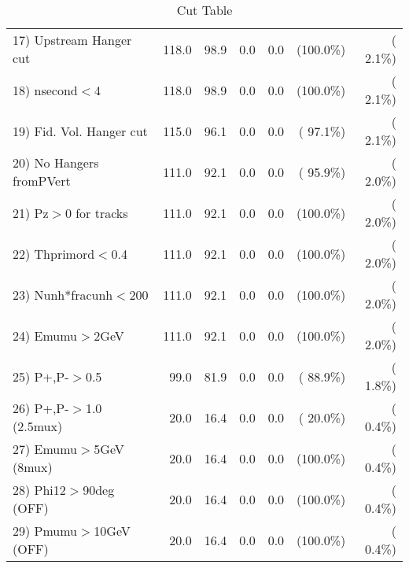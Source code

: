 \begin{table}[h!]
\begin{tabular}{||l||r|r|r|r|r|r||}
 17) Upstream Hanger cut  &        118.0 &         98.9 &          0.0 &          0.0 & (100.0\%) & (  2.1\%) \\
 18) nsecond$<$4          &        118.0 &         98.9 &          0.0 &          0.0 & (100.0\%) & (  2.1\%) \\
 19) Fid. Vol. Hanger cut &        115.0 &         96.1 &          0.0 &          0.0 & ( 97.1\%) & (  2.1\%) \\
 20) No Hangers fromPVert &        111.0 &         92.1 &          0.0 &          0.0 & ( 95.9\%) & (  2.0\%) \\
 21) Pz$>$0 for tracks    &        111.0 &         92.1 &          0.0 &          0.0 & (100.0\%) & (  2.0\%) \\
 22) Thprimord$<$0.4      &        111.0 &         92.1 &          0.0 &          0.0 & (100.0\%) & (  2.0\%) \\
 23) Nunh*fracunh$<$200   &        111.0 &         92.1 &          0.0 &          0.0 & (100.0\%) & (  2.0\%) \\
 24) Emumu$>$2GeV         &        111.0 &         92.1 &          0.0 &          0.0 & (100.0\%) & (  2.0\%) \\
 25) P+,P-$>$0.5          &         99.0 &         81.9 &          0.0 &          0.0 & ( 88.9\%) & (  1.8\%) \\
 26) P+,P-$>$1.0 (2.5mux) &         20.0 &         16.4 &          0.0 &          0.0 & ( 20.0\%) & (  0.4\%) \\
 27) Emumu$>$5GeV  (8mux) &         20.0 &         16.4 &          0.0 &          0.0 & (100.0\%) & (  0.4\%) \\
 28) Phi12$>$90deg  (OFF) &         20.0 &         16.4 &          0.0 &          0.0 & (100.0\%) & (  0.4\%) \\
 29) Pmumu$>$10GeV  (OFF) &         20.0 &         16.4 &          0.0 &          0.0 & (100.0\%) & (  0.4\%) \\
 \hline
 \hline
 \end{tabular}
 \caption{Cut Table           }
 \label{tab-cutcohjpsi-mumu_jpsi}
 \end{table}
